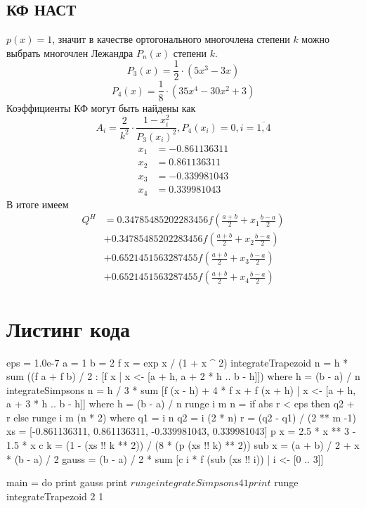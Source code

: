 \documentclass{article}
\begin{document}
\subsection*{КФ НАСТ}
$p(x) = 1$, значит в качестве ортогонального многочлена степени $k$ 
можно выбрать многочлен Лежандра $P_n(x)$ степени $k$.
\[P_3(x) = \frac{1}{2}\cdot \left(5x^3 - 3x\right)  \]
\[P_4(x) = \frac{1}{8}\cdot \left(35x^4 - 30x^2 + 3\right)  \]
Коэффициенты КФ могут быть найдены как
\[A_i = \frac{2}{k^2} \cdot \frac{1-x_i ^ 2}{P_3(x_i) ^ 2}, P_4(x_i) = 0, i = \overline{1, 4}\]
\begin{equation*}
    \begin{split}
        x_1 &= -0.861136311\\
        x_2 &= 0.861136311\\
        x_3 &= -0.339981043 \\
        x_4 &= 0.339981043
    \end{split}
\end{equation*}
В итоге имеем
\begin{equation*}
   \begin{split}
Q^H &=  0.34785485202283456 f(\frac{a + b}{2} + x_1  \frac{b - a}{2}) \\
&+ 0.34785485202283456 f(\frac{a + b}{2} + x_2 \frac{b - a}{2})  \\
&+ 0.6521451563287455 f(\frac{a + b}{2} + x_3  \frac{b - a}{2}) \\
&+ 0.6521451563287455 f(\frac{a + b}{2} + x_4  \frac{b - a}{2})
   \end{split} 
\end{equation*}





\section*{Листинг кода}
\begin{python}
eps = 1.0e-7
a = 1
b = 2
f x = exp x / (1 + x ^ 2)
integrateTrapezoid n = h * sum ((f a + f b) / 2 : [f x | x <- [a + h, a + 2 * h .. b - h]]) where h = (b - a) / n
integrateSimpsons n = h / 3 * sum [f (x - h) + 4 * f x + f (x + h) | x <- [a + h, a + 3 * h .. b - h]] where h = (b - a) / n
runge i m n = if abs r < eps then q2 + r else runge i m (n * 2)
  where q1 = i n
        q2 = i (2 * n)
        r = (q2 - q1) / (2 ** m -1)
xs = [-0.861136311, 0.861136311, -0.339981043, 0.339981043]
p x = 2.5 * x ** 3 - 1.5 * x
c k = (1 - (xs !! k ** 2)) / (8 * (p (xs !! k) ** 2))
sub x = (a + b) / 2 + x * (b - a) / 2
gauss = (b - a) / 2 * sum [c i * f (sub (xs !! i)) | i <- [0 .. 3]]

main = do
  print gauss
  print $ runge integrateSimpsons  4 1
  print $ runge integrateTrapezoid 2 1
\end{python}
\end{document}
